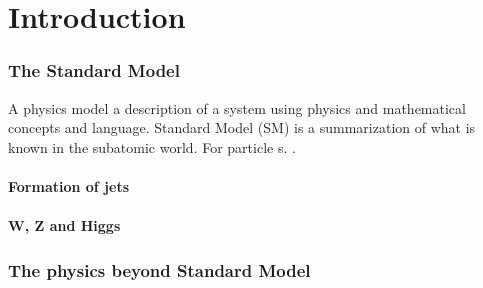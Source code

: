 \chapter{Introduction}
\label{label:chapIntro}

\subsection{The Standard Model}
A physics model a description of a system using physics and mathematical concepts and language.
Standard Model (SM) is a summarization of what is known in the subatomic world. 
For particle s. .  

\subsubsection{Formation of jets}
\subsubsection{W, Z and Higgs}


\subsection{The physics beyond Standard Model}
